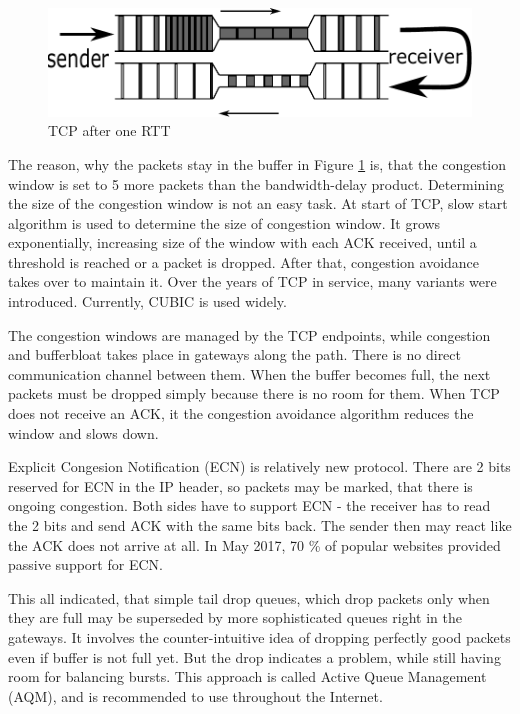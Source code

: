 \begin{figure}
	\centering
	\includegraphics[width=137mm]{drawings/tcp_bottleneck_2}
	\caption{TCP after one RTT}
	
	\label{fig03:bottle_2}
\end{figure}

The reason, why the packets stay in the buffer in Figure \ref{fig03:bottle_2} is, that the congestion window is set to 5 more packets than the bandwidth-delay product. Determining the size of the congestion window is not an easy task. At start of TCP, slow start algorithm \cite{Jacobson:1988:CAC:52324.52356} is used to determine the size of congestion window. It grows exponentially, increasing size of the window with each ACK received, until a threshold is reached or a packet is dropped. After that, congestion avoidance takes over to maintain it. Over the years of TCP in service, many variants were introduced. Currently, CUBIC \cite{CUBIC} is used widely. 

The congestion windows are managed by the TCP endpoints, while congestion and bufferbloat takes place in gateways along the path. There is no direct communication channel between them. When the buffer becomes full, the next packets must be dropped simply because there is no room for them. When TCP does not receive an ACK, it the congestion avoidance algorithm reduces the window and slows down.

Explicit Congesion Notification (ECN) \cite{rfc3168:ECN} is relatively new protocol. There are 2 bits reserved for ECN in the IP header, so packets may be marked, that there is ongoing congestion. Both sides have to support ECN  - the receiver has to read the 2 bits and send ACK with the same bits back. The sender then may react like the ACK does not arrive at all. In May 2017, 70 \% of popular websites provided passive support for ECN\cite{ECN:proceedings}.

This all indicated, that simple tail drop queues, which drop packets only when they are full may be superseded by more sophisticated queues right in the gateways. It involves the counter-intuitive idea of dropping perfectly good packets even if buffer is not full yet. But the drop indicates a problem, while still having room for balancing bursts. This approach is called Active Queue Management (AQM), and is recommended to use throughout the Internet.


